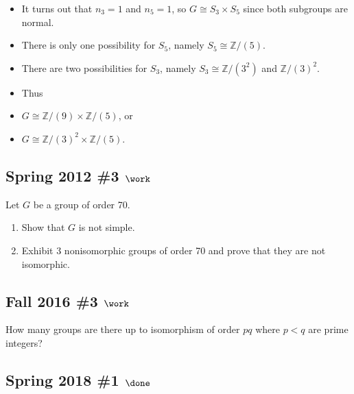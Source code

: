 \begin{solution}

\envlist

\begin{itemize}
\item
  It turns out that \(n_3 = 1\) and \(n_5 = 1\), so
  \(G \cong S_3 \times S_5\) since both subgroups are normal.
\item
  There is only one possibility for \(S_5\), namely
  \(S_5\cong {\mathbb{Z}}/(5)\).
\item
  There are two possibilities for \(S_3\), namely
  \(S_3 \cong {\mathbb{Z}}/(3^2)\) and \({\mathbb{Z}}/(3)^2\).
\item
  Thus
\item
  \(G \cong {\mathbb{Z}}/(9) \times{\mathbb{Z}}/(5)\), or
\item
  \(G \cong {\mathbb{Z}}/(3)^2 \times{\mathbb{Z}}/(5)\).
\end{itemize}

\end{solution}


\hypertarget{spring-2012-3-work}{%
\subsection{\texorpdfstring{Spring 2012 \#3
\(\work\)}{Spring 2012 \#3 \textbackslash work}}\label{spring-2012-3-work}}

Let \(G\) be a group of order 70.

\begin{enumerate}
\def\labelenumi{\alph{enumi}.}
\item
  Show that \(G\) is not simple.
\item
  Exhibit 3 nonisomorphic groups of order 70 and prove that they are not
  isomorphic.
\end{enumerate}

\hypertarget{fall-2016-3-work}{%
\subsection{\texorpdfstring{Fall 2016 \#3
\(\work\)}{Fall 2016 \#3 \textbackslash work}}\label{fall-2016-3-work}}

How many groups are there up to isomorphism of order \(pq\) where
\(p<q\) are prime integers?

\hypertarget{spring-2018-1-done}{%
\subsection{\texorpdfstring{Spring 2018 \#1
\(\done\)}{Spring 2018 \#1 \textbackslash done}}\label{spring-2018-1-done}}

